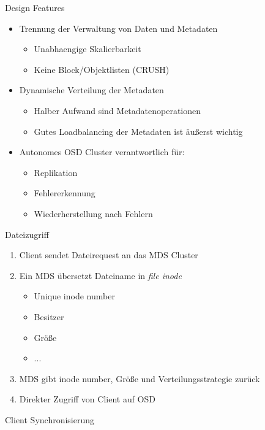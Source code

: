 \documentclass[notes=hide,yellow]{beamer}
\begin{document}
\begin{frame}{Design Features}
	\begin{itemize}
		\item Trennung der Verwaltung von Daten und Metadaten
		\begin{itemize}
			\item Unabhaengige Skalierbarkeit
			\item Keine Block/Objektlisten (CRUSH)
		\end{itemize}
		\item  Dynamische Verteilung der Metadaten
		\begin{itemize}
			\item Halber Aufwand sind Metadatenoperationen
			\item Gutes Loadbalancing der Metadaten ist \"außerst wichtig %
		\end{itemize}
		\item Autonomes OSD Cluster verantwortlich f\"ur:
			\begin{itemize}
				\item Replikation
				\item Fehlererkennung
				\item Wiederherstellung nach Fehlern
			\end{itemize}
	\end{itemize}	
\end{frame}

\begin{frame}{Dateizugriff}

\begin{enumerate}
	\item Client sendet Dateirequest an das MDS Cluster
	\item Ein MDS \"ubersetzt Dateiname in \textit{file inode}
	\begin{itemize}
		\item Unique inode number
		\item Besitzer
		\item Gr\"oße
		\item ...
	\end{itemize}
	\item MDS gibt inode number, Gr\"oße und Verteilungsstrategie zur\"uck
	\item Direkter Zugriff von Client auf OSD
\end{enumerate}
\end{frame}

\begin{frame}{Client Synchronisierung}
\end{frame}
\end{document}
